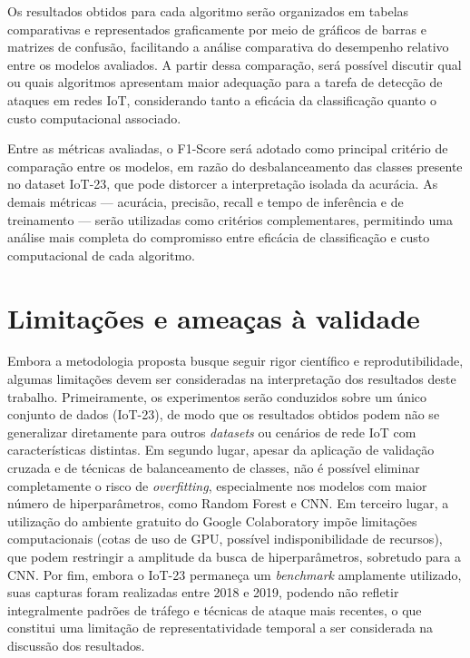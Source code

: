 Os resultados obtidos para cada algoritmo serão organizados em tabelas comparativas e representados graficamente por meio de gráficos de barras e matrizes de confusão, facilitando a análise comparativa do desempenho relativo entre os modelos avaliados. A partir dessa comparação, será possível discutir qual ou quais algoritmos apresentam maior adequação para a tarefa de detecção de ataques em redes IoT, considerando tanto a eficácia da classificação quanto o custo computacional associado.

Entre as métricas avaliadas, o F1-Score será adotado como principal critério de comparação entre os modelos, em razão do desbalanceamento das classes presente no dataset IoT-23, que pode distorcer a interpretação isolada da acurácia. As demais métricas — acurácia, precisão, recall e tempo de inferência e de treinamento — serão utilizadas como critérios complementares, permitindo uma análise mais completa do compromisso entre eficácia de classificação e custo computacional de cada algoritmo.

\section{Limitações e ameaças à validade}\label{sec:limitacoes}

Embora a metodologia proposta busque seguir rigor científico e reprodutibilidade, algumas limitações devem ser consideradas na interpretação dos resultados deste trabalho. Primeiramente, os experimentos serão conduzidos sobre um único conjunto de dados (IoT-23), de modo que os resultados obtidos podem não se generalizar diretamente para outros \textit{datasets} ou cenários de rede IoT com características distintas. Em segundo lugar, apesar da aplicação de validação cruzada e de técnicas de balanceamento de classes, não é possível eliminar completamente o risco de \textit{overfitting}, especialmente nos modelos com maior número de hiperparâmetros, como Random Forest e CNN. Em terceiro lugar, a utilização do ambiente gratuito do Google Colaboratory impõe limitações computacionais (cotas de uso de GPU, possível indisponibilidade de recursos), que podem restringir a amplitude da busca de hiperparâmetros, sobretudo para a CNN. Por fim, embora o IoT-23 permaneça um \textit{benchmark} amplamente utilizado, suas capturas foram realizadas entre 2018 e 2019, podendo não refletir integralmente padrões de tráfego e técnicas de ataque mais recentes, o que constitui uma limitação de representatividade temporal a ser considerada na discussão dos resultados.

